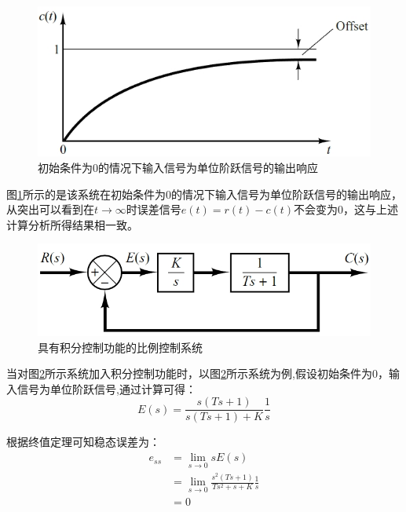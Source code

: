 \documentclass{article}
\numberwithin{equation}{section}
\numberwithin{figure}{section}
\begin{document}
\begin{figure}
    \centering
    \includegraphics[width=.6\textwidth]{Chapter5/steadystateerrorunitstep.png} %
    \caption{初始条件为0的情况下输入信号为单位阶跃信号的输出响应} %
    \label{steadystateerrorunitstep} %
\end{figure}

图\ref{steadystateerrorunitstep}所示的是该系统在初始条件为0的情况下输入信号为单位阶跃信号的输出响应，从突出可以看到在$t\rightarrow \infty$时误差信号$e(t)=r(t)-c(t)$不会变为0，这与上述计算分析所得结果相一致。

\begin{figure}
    \centering
    \includegraphics[width=.6\textwidth]{Chapter5/IntegralProportionalControlSystem.png} %
    \caption{具有积分控制功能的比例控制系统} %
    \label{IntegralProportionalControlSystem} %
\end{figure}

当对图\ref{IntegralProportionalControlSystem}所示系统加入积分控制功能时，以图\ref{IntegralProportionalControlSystem}所示系统为例,假设初始条件为0，输入信号为单位阶跃信号,通过计算可得：
\begin{equation}
    E(s)=\frac{s(Ts+1)}{s(Ts+1)+K}\frac{1}{s}
\end{equation}

根据终值定理可知稳态误差为：
\begin{equation}
    \begin{split}
        e_{ss}&=\lim_{s\rightarrow 0}sE(s)\\
        &=\lim_{s\rightarrow 0}\frac{s^2(Ts+1)}{Ts^2+s+K}\frac{1}{s}\\
        &=0
    \end{split}
\end{equation}
\end{document}
